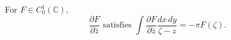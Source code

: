 
For $F \in C_0^1(\mathbb{C})$,
$$\frac{\partial F}{\partial \bar{z}} \text{ satisfies } \int \frac{\partial F}{\partial \bar{z}} \frac{dx\,dy}{\zeta - z} = -\pi F(\zeta).$$
